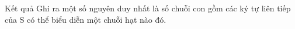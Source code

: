 Kết quả
Ghi ra một số nguyên duy nhất là số chuỗi con gồm các ký tự liên tiếp của S có thể biểu diễn một chuỗi hạt nào đó.